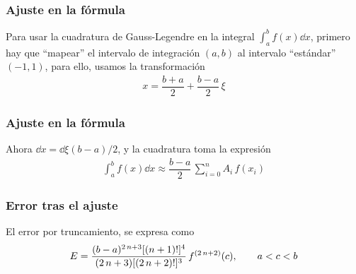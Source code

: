 \begin{frame}
\frametitle{Ajuste en la fórmula}
Para usar la cuadratura de Gauss-Legendre en la integral $\int_{a}^{b} f(x) \dd{x}$, primero hay que \enquote{mapear} el intervalo de integración $(a,b)$ al intervalo \enquote{estándar} $(-1,1)$, para ello, usamos la transformación
\begin{align*}
x = \dfrac{b + a}{2} + \dfrac{b - a}{2} \, \xi
\end{align*}
\end{frame}
\begin{frame}
\frametitle{Ajuste en la fórmula}
Ahora $\dd{x} = \dd{\xi} (b - a)/2$, y la cuadratura toma la expresión
\begin{align*}
\int_{a}^{b} f(x) \dd{x} \approx \dfrac{b - a}{2} \, \sum_{i=0}^{n} A_{i} \, f(x_{i})
\end{align*}
\end{frame}
\begin{frame}
\frametitle{Error tras el ajuste}
El error por truncamiento, se expresa como
\begin{align*}
E = \dfrac{(b - a)^{2 \, n + 3} [(n + 1)!]^{4}}{(2 \, n + 3)[(2 \, n + 2)!]^{3}} \, f^{(2 \, n + 2)} (c), \hspace{0.7cm} a < c < b
\end{align*}
\end{frame}
